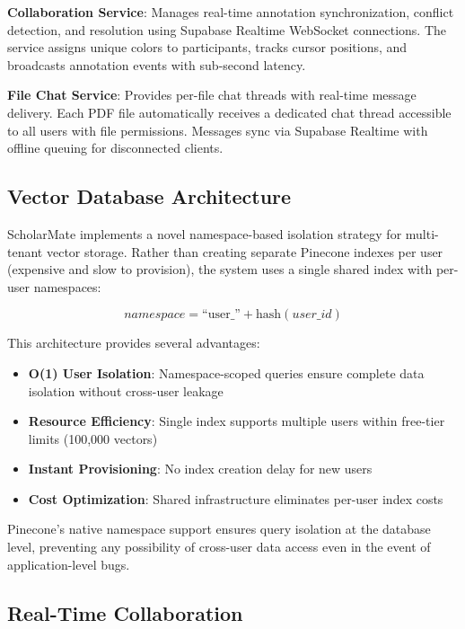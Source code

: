 \documentclass[conference]{IEEEtran}
\begin{document}
\textbf{Collaboration Service}: Manages real-time annotation synchronization, conflict detection, and resolution using Supabase Realtime WebSocket connections. The service assigns unique colors to participants, tracks cursor positions, and broadcasts annotation events with sub-second latency.

\textbf{File Chat Service}: Provides per-file chat threads with real-time message delivery. Each PDF file automatically receives a dedicated chat thread accessible to all users with file permissions. Messages sync via Supabase Realtime with offline queuing for disconnected clients.

\subsection{Vector Database Architecture}

ScholarMate implements a novel namespace-based isolation strategy for multi-tenant vector storage. Rather than creating separate Pinecone indexes per user (expensive and slow to provision), the system uses a single shared index with per-user namespaces:

\begin{equation}
namespace = \text{``user\_''} + \text{hash}(user\_id)
\end{equation}

This architecture provides several advantages:

\begin{itemize}
\item \textbf{O(1) User Isolation}: Namespace-scoped queries ensure complete data isolation without cross-user leakage
\item \textbf{Resource Efficiency}: Single index supports multiple users within free-tier limits (100,000 vectors)
\item \textbf{Instant Provisioning}: No index creation delay for new users
\item \textbf{Cost Optimization}: Shared infrastructure eliminates per-user index costs
\end{itemize}


Pinecone's native namespace support ensures query isolation at the database level, preventing any possibility of cross-user data access even in the event of application-level bugs.

\subsection{Real-Time Collaboration}
\end{document}
